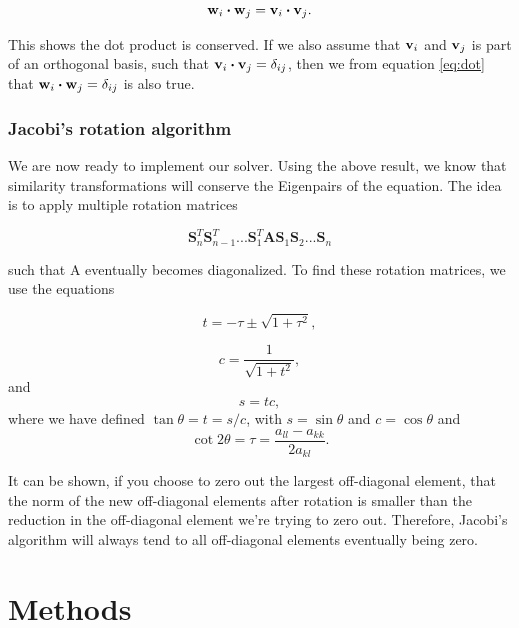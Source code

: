 \documentclass{emulateapj}
\begin{document}
\begin{equation} \label{eq:dot}
	\bold{w}_i \boldsymbol{\cdot} \bold{w}_j = \bold{v}_i \boldsymbol{\cdot} \bold{v}_j.
\end{equation}


This shows the dot product is conserved. If we also assume that $\bold{v}_i$ and $\bold{v}_j$ is part of an orthogonal basis, such that $\bold{v}_i \boldsymbol{\cdot} \bold{v}_j = \delta_{ij}$, then we from equation \ref{eq:dot} that $\bold{w}_i \boldsymbol{\cdot} \bold{w}_j = \delta_{ij}$ is also true.

\subsubsection{Jacobi's rotation algorithm}
We are now ready to implement our solver. Using the above result, we know that similarity transformations will conserve the Eigenpairs of the equation. The idea is to apply multiple rotation matrices

\[\mathbf{S}_n^T\mathbf{S}_{n-1}^T...\mathbf{S}_1^T\mathbf{A}\mathbf{S}_1\mathbf{S}_2...\mathbf{S}_n\]

such that A eventually becomes diagonalized. To find these rotation matrices, we use the equations

\begin{equation}
  t = -\tau \pm \sqrt{1+\tau^2},
\end{equation}

\begin{equation}
   c = \frac{1}{\sqrt{1+t^2}},
\end{equation}
and
\begin{equation}
    s = tc,
\end{equation}
where we have defined $\tan\theta = t= s/c$, with $s=\sin\theta$ and $c=\cos\theta$ and
\begin{equation*}
    \cot 2\theta=\tau = \frac{a_{ll}-a_{kk}}{2a_{kl}}.
\end{equation*}

It can be shown, if you choose to zero out the largest off-diagonal element, that the norm of the new off-diagonal elements after rotation is smaller than the reduction in the off-diagonal element we're trying to zero out. Therefore, Jacobi's algorithm will always tend to all off-diagonal elements eventually being zero.

\section{Methods}
\label{sec:methods}
\end{document}
